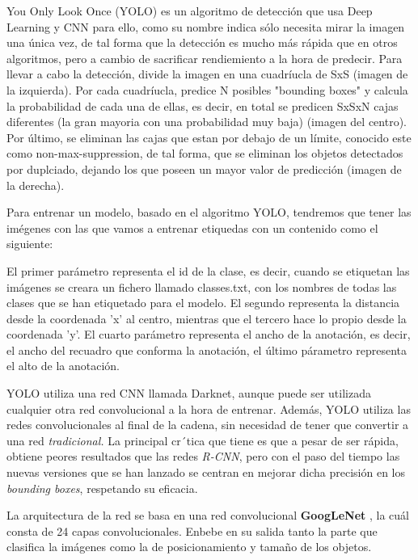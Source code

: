 You Only Look Once (YOLO) \cite{yolov4} es un algoritmo de detección que usa Deep Learning y CNN para ello, como su nombre indica sólo necesita mirar la imagen una única vez, de tal forma que la detección es mucho más rápida que en otros algoritmos, pero a cambio de sacrificar rendiemiento a la hora de predecir.
Para llevar a cabo la detección, divide la imagen en una cuadríucla de SxS (imagen de la izquierda). Por cada cuadríucla, predice N posibles "bounding boxes" y calcula la probabilidad de cada una de ellas, es decir, en total se predicen SxSxN cajas diferentes (la gran mayoria con una probabilidad muy baja) (imagen del centro). 
Por último, se eliminan las cajas que estan por debajo de un límite, conocido este como non-max-suppression, de tal forma, que se eliminan los objetos detectados por duplciado, dejando los que poseen un mayor valor de predicción (imagen de la derecha).


Para entrenar un modelo, basado en el algoritmo YOLO, tendremos que tener las imégenes con las que vamos a entrenar etiquedas con un contenido como el siguiente:


El primer parámetro representa el id de la clase, es decir, cuando se etiquetan las imágenes se creara un fichero llamado classes.txt, con los nombres de todas las clases que se han etiquetado para el modelo.
El segundo representa la distancia desde la coordenada 'x' al centro, mientras que el tercero hace lo propio desde la coordenada 'y'.
El cuarto parámetro representa el ancho de la anotación, es decir, el ancho del recuadro que conforma la anotación, el último párametro representa el alto de la anotación.

YOLO utiliza una red CNN llamada Darknet, aunque puede ser utilizada cualquier otra red convolucional a la hora de entrenar. Además, YOLO utiliza las redes convolucionales al final de la cadena, sin necesidad de tener que convertir a una red \textit{tradicional.}
La principal cr´tica que tiene es que a pesar de ser rápida, obtiene peores resultados que las redes \textit{R-CNN}, pero con el paso del tiempo las nuevas versiones que se han lanzado se centran en mejorar dicha precisión en los \textit{bounding boxes}, respetando su eficacia.

La arquitectura de la red se basa en una red convolucional \textbf{GoogLeNet} \cite{googlenet}, la cuál consta de 24 capas convolucionales. Enbebe en su salida tanto la parte que clasifica la imágenes como la de posicionamiento y tamaño de los objetos.

